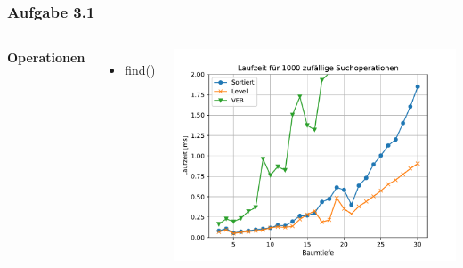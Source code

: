 \documentclass[aspectratio=169]{beamer}
\begin{document}

\begin{frame}
	\frametitle{Aufgabe 3.1}
	\begin{columns}[c] %
		
		\textbf{Operationen}
		\begin{itemize}
			\item find()
		\end{itemize}
		
		\includegraphics[scale=.6]{Figure_4.pdf}
		
		
	\end{columns}
	\end{frame}
	
\end{document}
